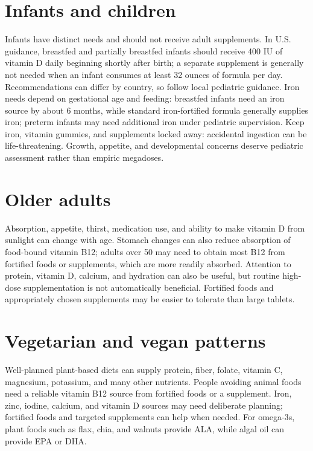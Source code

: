 \section{Infants and children}
Infants have distinct needs and should not receive adult supplements. In U.S. guidance, breastfed and partially breastfed infants should receive 400 IU of vitamin D daily beginning shortly after birth; a separate supplement is generally not needed when an infant consumes at least 32 ounces of formula per day. Recommendations can differ by country, so follow local pediatric guidance. Iron needs depend on gestational age and feeding: breastfed infants need an iron source by about 6 months, while standard iron-fortified formula generally supplies iron; preterm infants may need additional iron under pediatric supervision. Keep iron, vitamin gummies, and supplements locked away: accidental ingestion can be life-threatening. Growth, appetite, and developmental concerns deserve pediatric assessment rather than empiric megadoses. \cite{cdcInfantVitaminD,cdcInfantIron}

\section{Older adults}
Absorption, appetite, thirst, medication use, and ability to make vitamin D from sunlight can change with age. Stomach changes can also reduce absorption of food-bound vitamin B12; adults over 50 may need to obtain most B12 from fortified foods or supplements, which are more readily absorbed. Attention to protein, vitamin D, calcium, and hydration can also be useful, but routine high-dose supplementation is not automatically beneficial. Fortified foods and appropriately chosen supplements may be easier to tolerate than large tablets. \cite{odsB12,odsD,odsCa}

\section{Vegetarian and vegan patterns}
Well-planned plant-based diets can supply protein, fiber, folate, vitamin C, magnesium, potassium, and many other nutrients. People avoiding animal foods need a reliable vitamin B12 source from fortified foods or a supplement. Iron, zinc, iodine, calcium, and vitamin D sources may need deliberate planning; fortified foods and targeted supplements can help when needed. For omega-3s, plant foods such as flax, chia, and walnuts provide ALA, while algal oil can provide EPA or DHA. \cite{odsB12,odsIron,odsZinc,odsIodine,odsCa,odsD,odsOmega3}

